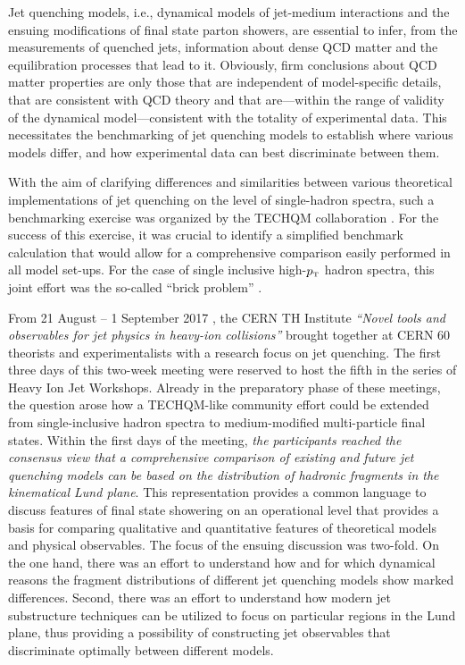 Jet quenching models, i.e., dynamical models of jet-medium interactions and the ensuing modifications of final state parton showers, are essential to 
infer, from the measurements of quenched jets, information about dense QCD matter and the equilibration processes that lead to it. Obviously, firm 
conclusions about QCD matter properties are only those that are independent of model-specific details, that are consistent with QCD theory and that are---within the range of validity of the dynamical model---consistent with the totality of experimental data. This necessitates the benchmarking of jet quenching models to establish where various models differ, and how experimental data can best discriminate between them.

With the aim of clarifying differences and similarities between various theoretical implementations of jet quenching on the level of single-hadron spectra, such a benchmarking exercise was organized by the TECHQM collaboration \cite{TECHQM}. For the success of this exercise, it was crucial to identify a simplified 
benchmark calculation that would allow for a comprehensive comparison easily performed in all model set-ups. For the case of single inclusive
high-$p_{\text{\tiny T}}$ hadron spectra, this joint effort was the so-called ``brick problem'' \cite{Armesto:2011ht,Burke:2013yra}.

From 21 August -- 1 September 2017 \cite{THinst}, the CERN TH Institute  \textsl{``Novel tools and observables for jet physics in heavy-ion collisions''} brought 
together at CERN 60 theorists and experimentalists with a research focus on jet quenching. The first three days of this two-week meeting were reserved 
to host the fifth in the series of Heavy Ion Jet Workshops.
Already in the preparatory phase of these meetings, the question arose how a TECHQM-like community 
effort could be extended from single-inclusive hadron spectra to medium-modified multi-particle final states. Within the first days of the meeting, \emph{the 
participants reached the consensus view that a comprehensive comparison of existing and future jet quenching models can be based on the
distribution of hadronic fragments in the kinematical Lund plane}. 
This representation provides a common language to discuss features of final state showering on an operational level that provides a basis for comparing qualitative and quantitative features of theoretical models and physical observables.
The focus of the ensuing discussion was two-fold. On the one hand, there was an effort to understand
how and for which dynamical reasons the fragment distributions of different jet quenching models show marked differences. Second, there was an
effort to understand how modern jet substructure techniques can be utilized to focus on particular regions in the Lund plane, thus providing a possibility of
constructing jet observables that discriminate optimally between different models. 

